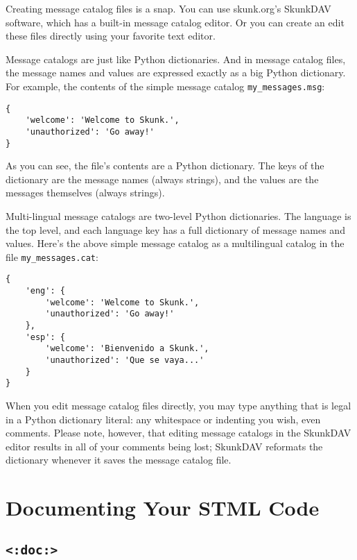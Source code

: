 \documentclass{manual}
\begin{document}
Creating message catalog files is a snap. You can
use skunk.org's SkunkDAV software, which has a built-in
message catalog editor. Or you can create an edit
these files directly using your favorite text editor.

Message catalogs are just like Python dictionaries.
And in message catalog files, the message names and
values are expressed exactly as a big Python dictionary.
For example, the contents of the simple message catalog
\texttt{my_messages.msg}:

\begin{verbatim}
{
    'welcome': 'Welcome to Skunk.',
    'unauthorized': 'Go away!'
}
\end{verbatim}


As you can see, the file's contents are a
Python dictionary. The keys of the dictionary
are the message names (always strings), and
the values are the messages themselves (always
strings).

Multi-lingual message catalogs are two-level
Python dictionaries. The language is the top level,
and each language key has a full dictionary of 
message names and values. Here's the above simple
message catalog as a multilingual catalog in
the file \texttt{my_messages.cat}:

\begin{verbatim}
{
    'eng': {
        'welcome': 'Welcome to Skunk.',
        'unauthorized': 'Go away!'
    },
    'esp': {
        'welcome': 'Bienvenido a Skunk.',
        'unauthorized': 'Que se vaya...'
    }
}
\end{verbatim}


When you edit message catalog files directly,
you may type anything that is legal in a Python
dictionary literal: any whitespace or indenting you wish,
even comments. Please note, however, that editing
message catalogs in the SkunkDAV editor results in 
all of your comments being lost; SkunkDAV
reformats the dictionary whenever it saves the
message catalog file.

\chapter{Documenting Your STML Code}
\label{stmlrefmisc}



\section{\texttt{<:doc:>}}
\label{tagdoc}
\end{document}
